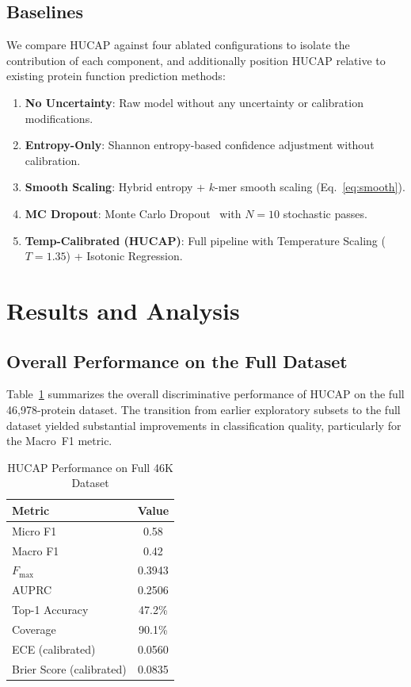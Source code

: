 \documentclass[conference]{IEEEtran}
\begin{document}
\subsection{Baselines}
We compare HUCAP against four ablated configurations to isolate the contribution of each component, and additionally position HUCAP relative to existing protein function prediction methods:
\begin{enumerate}
    \item \textbf{No Uncertainty}: Raw model without any uncertainty or calibration modifications.
    \item \textbf{Entropy-Only}: Shannon entropy-based confidence adjustment without calibration.
    \item \textbf{Smooth Scaling}: Hybrid entropy + $k$-mer smooth scaling (Eq.~\ref{eq:smooth}).
    \item \textbf{MC Dropout}: Monte Carlo Dropout~\cite{gal2016} with $N=10$ stochastic passes.
    \item \textbf{Temp-Calibrated (HUCAP)}: Full pipeline with Temperature Scaling ($T=1.35$) + Isotonic Regression.
\end{enumerate}

\section{Results and Analysis}

\subsection{Overall Performance on the Full Dataset}

Table~\ref{tab:full_perf} summarizes the overall discriminative performance of HUCAP on the full 46{,}978-protein dataset. The transition from earlier exploratory subsets to the full dataset yielded substantial improvements in classification quality, particularly for the Macro~F1 metric.

\begin{table}[t]
\centering
\caption{HUCAP Performance on Full 46K Dataset}
\label{tab:full_perf}
\begin{tabular}{@{}lc@{}}
\toprule
\textbf{Metric} & \textbf{Value} \\
\midrule
Micro F1 & 0.58 \\
Macro F1 & 0.42 \\
$F_{\max}$ & 0.3943 \\
AUPRC & 0.2506 \\
Top-1 Accuracy & 47.2\% \\
Coverage & 90.1\% \\
ECE (calibrated) & 0.0560 \\
Brier Score (calibrated) & 0.0835 \\
\bottomrule
\end{tabular}
\end{table}
\end{document}
